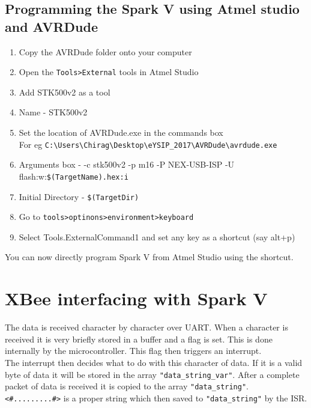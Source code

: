 \documentclass[main.tex]{subfiles}
\begin{document}
		\subsection{Programming the Spark V using Atmel studio and AVRDude}
		\begin{enumerate}
			\item Copy the AVRDude folder onto your computer
			\item Open the \verb|Tools>External| tools in Atmel Studio
			\item Add STK500v2 as a tool
			\item Name - STK500v2
			\item Set the location of AVRDude.exe in the commands box\\
			 	  For eg \verb|C:\Users\Chirag\Desktop\eYSIP_2017\AVRDude\avrdude.exe|
			\item Arguments box - -c stk500v2 -p m16 -P NEX-USB-ISP -U flash:w:\verb|$(TargetName).hex:i|
			\item Initial Directory - \verb|$(TargetDir)|
			\item Go to \verb|tools>optinons>environment>keyboard|
			\item Select Tools.ExternalCommand1 and set any key as a shortcut (say alt+p) 
		\end{enumerate}
	You can now directly program Spark V from Atmel Studio using the shortcut.
						
	\pagebreak				
	\section{XBee interfacing with Spark V}
	
	The data is received character by character over UART. When a character is received it is very briefly stored in a buffer and a flag is set. This is done internally by the microcontroller. 
	This flag then triggers an interrupt.\\
	The interrupt then decides what to do with this character of data. If it is a valid byte of data it will be stored in the array \verb|"data_string_var"|. After a complete packet of data is received it is copied to the array \verb|"data_string"|.\\
	
	\verb|<#.........#>| is a proper string which then saved to \verb|"data_string"| by the ISR.\\
		
\end{document}
